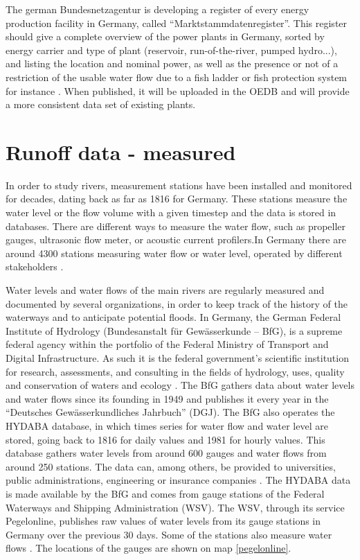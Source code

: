 The german Bundesnetzagentur is developing a register of every energy production facility in Germany, called ``Marktstammdatenregister''. This register should give a complete overview of the power plants in Germany, sorted by energy carrier and type of plant (reservoir, run-of-the-river, pumped hydro...), and listing the location and nominal power, as well as the presence or not of a restriction of the usable water flow due to a fish ladder or fish protection system for instance \cite{MaStR}. \newline
When published, it will be uploaded in the OEDB and will provide a more consistent data set of existing plants.

\section{Runoff data - measured}

\label{sec:meas_runoff}

In order to study rivers, measurement stations have been installed and monitored for decades, dating back as far as 1816 for Germany. These stations measure the water level or the flow volume with a given timestep and the data is stored in databases. There are different ways to measure the water flow, such as propeller gauges, ultrasonic flow meter, or acoustic current profilers.In Germany there are around 4300 stations measuring water flow or water level, operated by different stakeholders \cite{bafg_hyd}.

Water levels and water flows of the main rivers are regularly measured and documented by several organizations, in order to keep track of the history of the waterways and to anticipate potential floods. In Germany, the German Federal Institute of Hydrology (Bundesanstalt für Gewässerkunde – BfG), is a supreme federal agency within the portfolio of the Federal Ministry of Transport and Digital Infrastructure. As such it is the federal government's scientific institution for research, assessments, and consulting in the fields of hydrology, uses, quality and conservation of waters and ecology \cite{bafg}. The BfG gathers data about water levels and water flows since its founding in 1949 and publishes it every year in the ``Deutsches Gewässerkundliches Jahrbuch'' (DGJ). The BfG also operates the HYDABA database, in which times series for water flow and water level are stored, going back to 1816 for daily values and 1981 for hourly values. This database gathers water levels from around 600 gauges and water flows from around 250 stations. The data can, among others, be provided to universities, public administrations, engineering or insurance companies \cite{bafg_hyd}. \newline
The HYDABA data is made available by the BfG and comes from gauge stations of the Federal Waterways and Shipping Administration (WSV). The WSV, through its service Pegelonline, publishes raw values of water levels from its gauge stations in Germany over the previous 30 days. Some of the stations also measure water flows \cite{pegelonline}. The locations of the gauges are shown on map \ref{pegelonline}.

